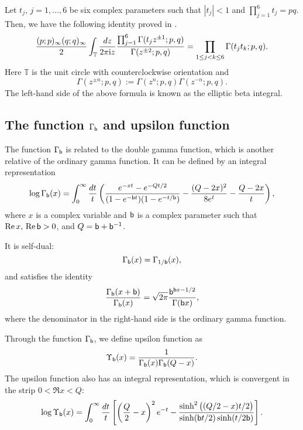 Let $t_j$, $j=1,\ldots,6$ be six complex parameters such that $|t_j|<1$ and $\prod_{j=1}^6 t_j=pq$.
Then, we have the following identity proved in \cite{MR1846786}.
\begin{equation}
    \frac{(p;p)_{\infty} (q;q)_{\infty}}{2}
        \int_{\mathbb T}\frac{dz}{2\pi\mathrm{i} z} \frac{\prod_{j=1}^6\Gamma(t_j z^{\pm 1};p,q)}{\Gamma(z^{\pm 2};p,q)}
            =\prod_{1\leq j<k \leq 6} \Gamma(t_j t_k;p,q).
\end{equation}
Here ${\mathbb T}$ is the unit circle with counterclockwise orientation and
\begin{equation}
    \Gamma(z^{\pm n};p,q) := \Gamma(z^{n};p,q) \Gamma(z^{-n};p,q).
\end{equation}
The left-hand side of the above formula is known as the elliptic beta integral.





\subsection{The function $\Gamma_{\mathsf{b}}$ and upsilon function}

The function $\Gamma_{\mathsf{b}}$ is related to the double gamma function,
which is another relative of the ordinary gamma function.
It can be defined by an integral representation
\begin{equation}
    \log \Gamma_{\mathsf{b}}(x) =\int_0^{\infty}
        \frac{dt}{t}\left( \frac{e^{-xt}-e^{-Qt/2}}{(1-e^{-\mathsf{b} t})(1-e^{-t/\mathsf{b}})}
            -\frac{(Q-2x)^2}{8e^t} -\frac{Q-2x}{t} \right),
\end{equation}
where $x$ is a complex variable and $\mathsf{b}$ is a complex parameter such that $\mathop{\mathrm{Re}}\nolimits x,\,\mathop{\mathrm{Re}}\nolimits \mathsf{b} >0$,
and $Q=\mathsf{b} + \mathsf{b}^{-1}$.

It is self-dual:
\begin{equation}
    \Gamma_{\mathsf{b}}(x) = \Gamma_{1/\mathsf{b}}(x),
\end{equation}
and satisfies the identity
\begin{equation}
    \frac{\Gamma_{\mathsf{b}}(x+\mathsf{b})}{\Gamma_{\mathsf{b}}(x)}
        = \sqrt{2\pi} \frac{\mathsf{b}^{\mathsf{b} x-1/2}}{\Gamma(\mathsf{b} x)},
\end{equation}
where the denominator in the right-hand side is the ordinary gamma function.

Through the function $\Gamma_{\mathsf{b}}$, we define upsilon function as
\begin{equation}
    \Upsilon_{\mathsf{b}}(x) = \frac{1}{\Gamma_{\mathsf{b}}(x) \Gamma_{\mathsf{b}}(Q-x)}.
\end{equation}
The upsilon function also has an integral representation, which is convergent in the
strip $0<\Re x<Q$:
\begin{equation}
    \log \Upsilon_{\mathsf{b}}(x) =\int_0^{\infty}
    \frac{dt}{t}\left[ \left( \frac{Q}{2} -x \right)^2 e^{-t}
        - \frac{\sinh^2\big((Q/2-x)t/2\big)}{\sinh(\mathsf{b} t/2)\sinh(t/2\mathsf{b})} \right].
\end{equation}

